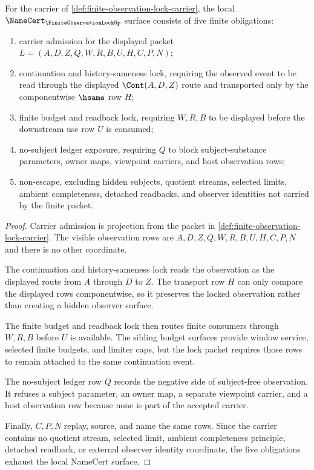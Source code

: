 \begin{theorem}
\label{thm:finite-observation-lock-namecert-obligations}
For the carrier of \autoref{def:finite-observation-lock-carrier}, the local $\NameCert_{\FiniteObservationLockUp}$ surface consists of five finite obligations:
\begin{enumerate}
\item carrier admission for the displayed packet $L=(A,D,Z,Q,W,R,B,U,H,C,P,N)$;
\item continuation and history-sameness lock, requiring the observed event to be read through the displayed $\Cont(A,D,Z)$ route and transported only by the componentwise $\hsame$ row $H$;
\item finite budget and readback lock, requiring $W,R,B$ to be displayed before the downstream use row $U$ is consumed;
\item no-subject ledger exposure, requiring $Q$ to block subject-substance parameters, owner maps, viewpoint carriers, and host observation rows;
\item non-escape, excluding hidden subjects, quotient streams, selected limits, ambient completeness, detached readbacks, and observer identities not carried by the finite packet.
\end{enumerate}
\end{theorem}
\begin{proof}
Carrier admission is projection from the packet in \autoref{def:finite-observation-lock-carrier}. The visible observation rows are $A,D,Z,Q,W,R,B,U,H,C,P,N$ and there is no other coordinate.

The continuation and history-sameness lock reads the observation as the displayed route from $A$ through $D$ to $Z$. The transport row $H$ can only compare the displayed rows componentwise, so it preserves the locked observation rather than creating a hidden observer surface.

The finite budget and readback lock then routes finite consumers through $W,R,B$ before $U$ is available. The sibling budget surfaces provide window service, selected finite budgets, and limiter caps, but the lock packet requires those rows to remain attached to the same continuation event.

The no-subject ledger row $Q$ records the negative side of subject-free observation. It refuses a subject parameter, an owner map, a separate viewpoint carrier, and a host observation row because none is part of the accepted carrier.

Finally, $C,P,N$ replay, source, and name the same rows. Since the carrier contains no quotient stream, selected limit, ambient completeness principle, detached readback, or external observer identity coordinate, the five obligations exhaust the local NameCert surface.
\end{proof}

